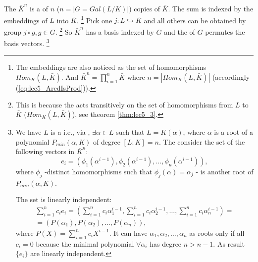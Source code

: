 The $\bar{K}^n$ is a  of $n$
($n = \left|G = Gal\left(L/K\right)\right|$)
copies of $\bar{K}$.
The sum is indexed by the embeddings of $L$ into
$\bar{K}$.
\footnote{
  The embeddings are also noticed as the set of 
  homomorphisms $Hom_K\left(L, \bar{K}\right)$.
  And $\bar{K}^n = \prod_{i=1}^n\bar{K}$ where
  $n = \left|Hom_K\left(L, \bar{K}\right)\right|$ (accordingly
  (\ref{eq:lec5_AredIsProd})).
}
Pick one $j: L \hookrightarrow \bar{K}$ and all others can
be obtained by group  $j \circ g, g \in G$.
\footnote{
  This is because the  acts transitively on
  the set of homomorphisms from $L$ to $\bar{K}$ ($Hom_K\left(L,
  \bar{K}\right)$), see theorem \ref{thm:lec5_3}. 
}
So
$\bar{K}^n$ has a basis indexed by $G$ and the  of
$G$ permutes the basis vectors.
\footnote{
  We have $L$ is a  i.e., via
  , $\exists \alpha \in L$
  such that $L=K\left(\alpha\right)$, where $\alpha$ is a root of a
  polynomial $P_{min}\left(\alpha, K\right)$ of degree $\left[L:K\right] = n$.
  The consider the set of the following vectors in $\bar{K}^n$:
  \[  
  e_i = \left(\phi_1(\alpha^{i-1}), \phi_2(\alpha^{i-1}), \dots,
  \phi_n(\alpha^{i-1})\right), 
  \]
  where $\phi_j$ -distinct homomorphisms such that $\phi_j(\alpha) =
  \alpha_j$ - is another root of $P_{min}\left(\alpha, K\right)$.
  
  The set is linearly independent:
  \begin{eqnarray}
    \sum_{i=1}^{n}c_i e_i =
    \left(\sum_{i=1}^{n} c_i \alpha_1^{i-1},
    \sum_{i=1}^{n} c_i \alpha_2^{i-1}, \dots,
    \sum_{i=1}^{n} c_i \alpha_n^{i-1}\right) =
    \nonumber \\
    = \left(P(\alpha_1), P(\alpha_2), \dots, P(\alpha_n)\right),
    \nonumber
  \end{eqnarray}
  where $P(X) = \sum_{i=1}^{n}c_i X^{i-1}$. It can have $\alpha_1,
  \alpha_2, \dots, \alpha_n$ as roots only if all $c_i = 0$
  because the minimal polynomial $\forall \alpha_i$ has degree $n >
  n-1$.
  As result
  $\{e_i\}$ are linearly independent.

}
